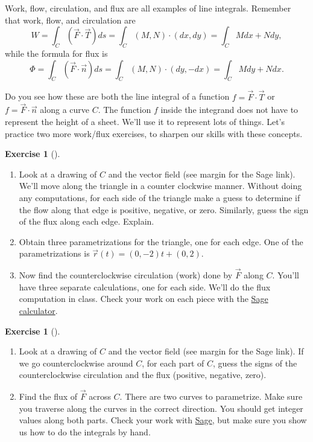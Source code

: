 \documentclass[10pt,]{book}
\theoremstyle{plain}
\theoremstyle{definition}
\theoremstyle{definition}
\theoremstyle{definition}
\theoremstyle{definition}
\newtheorem{exploration}[project]{Exercise}
\theoremstyle{definition}
\numberwithin{equation}{section}
\newcommand{\sageworkfluxurl}{http://bmw.byuimath.com/dokuwiki/doku.php?id=both_flux_and_work}
\begin{document}
Work, flow, circulation, and flux are all examples of line integrals. Remember that work, flow, and circulation are%
\begin{equation*}
W=\int_C (\vec F\cdot \vec T)ds =\int_C (M,N)\cdot(dx,dy) =  \int_C Mdx+Ndy,
\end{equation*}
while the formula for flux is%
\begin{equation*}
\Phi=\int_C (\vec F\cdot \vec n)ds =\int_C (M,N)\cdot(dy,-dx) =  \int_C Mdy+Ndx.
\end{equation*}
%
\par
Do you see how these are both the line integral of a function \(f = \vec F\cdot \vec T\) or \(f=\vec F\cdot \vec n\) along a curve \(C\). The function \(f\) inside the integrand does not have to represent the height of a sheet. We'll use it to represent lots of things. Let's practice two more work/flux exercises, to sharpen our skills with these concepts.%
\begin{exploration}[]\label{exploration-202}
\leavevmode%
\begin{enumerate}[font=\bfseries,label=(\alph*),ref=\alph*]
\item\label{task-508} Look at a drawing of \(C\) and the vector field (see margin for the Sage link).  We'll move along the triangle in a counter clockwise manner. Without doing any computations, for each side of the triangle make a guess to determine if the flow along that edge is positive, negative, or zero. Similarly, guess the sign of the flux along each edge.  Explain.%
\item\label{task-509} Obtain three parametrizations for the triangle, one for each edge.  One of the parametrizations is \(\vec r(t) = (0,-2)t+(0,2)\).%
\item\label{task-510} Now find the counterclockwise circulation (work) done by \(\vec F\) along \(C\).  You'll have three separate calculations, one for each side. We'll do the flux computation in class. Check your work on each piece with the \href{\\sageworkfluxurl}{Sage calculator}.%
\end{enumerate}
\end{exploration}
\begin{exploration}[]\label{exploration-203}
\leavevmode%
\begin{enumerate}[font=\bfseries,label=(\alph*),ref=\alph*]
\item\label{task-511} Look at a drawing of \(C\) and the vector field (see margin for the Sage link).  If we go counterclockwise around \(C\), for each part of \(C\), guess the signs of the counterclockwise circulation and the flux (positive, negative, zero).%
\item\label{task-512} Find the flux of \(\vec F\) across \(C\).  There are two curves to parametrize. Make sure you traverse along the curves in the correct direction. You should get integer values along both parts. Check your work with \href{\\sageworkfluxurl}{Sage}, but make sure you show us how to do the integrals by hand.%
%
\end{enumerate}
\end{exploration}
\end{document}
